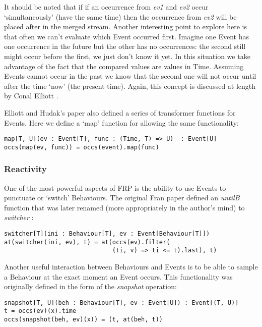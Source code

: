      It should be noted that if if an occurrence from \emph{ev1} and \emph{ev2} occur `simultaneously' (have the same time) then
      the occurrence from \emph{ev2} will be placed after in the merged stream. Another interesting point to explore
      here is that often we can't evaluate which Event occurred first. Imagine one Event has one occurrence in
      the future but the other has no occurrences: the second still might occur before the first, we just don't know it
      yet. In this situation we take advantage of the fact that the compared values are values in Time. Assuming
      Events cannot occur in the past we know that the second one will not occur until after the time `now' (the
      present time). Again, this concept is discussed at length by Conal Elliott \cite{Elliott2009}.
       
       Elliott and Hudak's paper also defined a series of transformer functions for Events. Here we define a
       `map' function for allowing the same functionality:

\begin{verbatim}
map[T, U](ev : Event[T], func : (Time, T) => U)  : Event[U]
occs(map(ev, func)) = occs(event).map(func)
\end{verbatim}         
        
      \subsubsection{Reactivity}
        One of the most powerful aspects of FRP is the ability to use Events to punctuate or `switch' Behaviours.
        The original Fran paper defined an \emph{untilB} function that was later renamed (more appropriately in the
        author's mind) to \emph{switcher} \cite{Elliott2009}:

\begin{verbatim}
switcher[T](ini : Behaviour[T], ev : Event[Behaviour[T]])
at(switcher(ini, ev), t) = at(occs(ev).filter(
                              (ti, v) => ti <= t).last), t)
\end{verbatim}

        Another useful interaction between Behaviours and Events is to be able to sample
        a Behaviour at the exact moment an Event occurs. This functionality was originally defined in the
        form of the \emph{snapshot} operation:

\begin{verbatim}
snapshot[T, U](beh : Behaviour[T], ev : Event[U]) : Event[(T, U)]
t = occs(ev)(x).time
occs(snapshot(beh, ev)(x)) = (t, at(beh, t))
\end{verbatim} 
  
